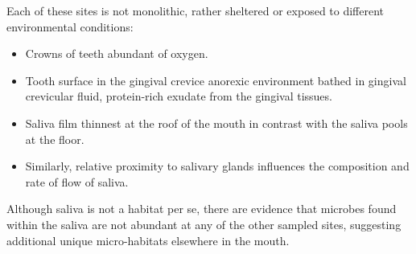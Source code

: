 Each of these sites is not monolithic, rather sheltered or exposed to different environmental conditions: 
\begin{itemize}
    \item Crowns of teeth abundant of oxygen.
    \item Tooth surface in the gingival crevice anorexic environment bathed in gingival crevicular fluid, protein-rich 
    exudate from the gingival tissues. 
    \item Saliva film thinnest at the roof of the mouth in contrast with the saliva pools at the floor. 
    \item Similarly, relative proximity to salivary glands influences the composition and rate of flow of saliva. 
\end{itemize}

Although saliva is not a habitat per se, there are evidence that microbes found within the saliva are not abundant at 
any of the other sampled sites, suggesting additional unique micro-habitats elsewhere in the mouth. 


